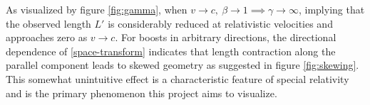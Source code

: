 \documentclass[a4paper]{article}
\begin{document}

As visualized by figure \ref{fig:gamma}, when $v\to c,\ \beta \to 1 \implies \gamma \to \infty$, implying that the observed length $L'$ is considerably reduced at relativistic velocities and approaches zero as $v\to c$. For boosts in arbitrary directions, the directional dependence of \eqref{space-transform} indicates that length contraction along the parallel component leads to skewed geometry as suggested in figure \ref{fig:skewing}. This somewhat unintuitive effect is a characteristic feature of special relativity and is the primary phenomenon this project aims to visualize.

\end{document}
